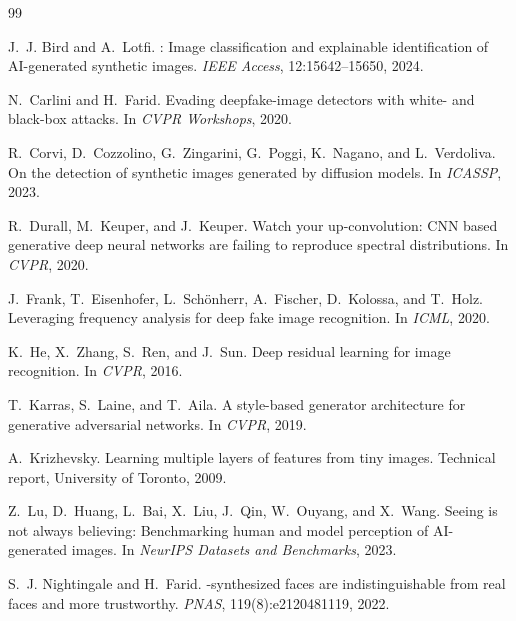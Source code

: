 \documentclass{article}
\begin{document}

\begin{thebibliography}{99}

J.~J. Bird and A.~Lotfi.
: {I}mage classification and explainable
  identification of {AI}-generated synthetic images.
\newblock \emph{IEEE Access}, 12:15642--15650, 2024.

N.~Carlini and H.~Farid.
\newblock Evading deepfake-image detectors with white- and black-box
  attacks.
\newblock In \emph{CVPR Workshops}, 2020.

R.~Corvi, D.~Cozzolino, G.~Zingarini, G.~Poggi, K.~Nagano, and
  L.~Verdoliva.
\newblock On the detection of synthetic images generated by diffusion
  models.
\newblock In \emph{ICASSP}, 2023.

R.~Durall, M.~Keuper, and J.~Keuper.
\newblock Watch your up-convolution: {CNN} based generative deep
  neural networks are failing to reproduce spectral distributions.
\newblock In \emph{CVPR}, 2020.

J.~Frank, T.~Eisenhofer, L.~Schönherr, A.~Fischer, D.~Kolossa, and
  T.~Holz.
\newblock Leveraging frequency analysis for deep fake image
  recognition.
\newblock In \emph{ICML}, 2020.

K.~He, X.~Zhang, S.~Ren, and J.~Sun.
\newblock Deep residual learning for image recognition.
\newblock In \emph{CVPR}, 2016.

T.~Karras, S.~Laine, and T.~Aila.
\newblock A style-based generator architecture for generative
  adversarial networks.
\newblock In \emph{CVPR}, 2019.

A.~Krizhevsky.
\newblock Learning multiple layers of features from tiny images.
\newblock Technical report, University of Toronto, 2009.

Z.~Lu, D.~Huang, L.~Bai, X.~Liu, J.~Qin, W.~Ouyang, and X.~Wang.
\newblock Seeing is not always believing: Benchmarking human and model
  perception of {AI}-generated images.
\newblock In \emph{NeurIPS Datasets and Benchmarks}, 2023.

S.~J. Nightingale and H.~Farid.
-synthesized faces are indistinguishable from real
  faces and more trustworthy.
\newblock \emph{PNAS}, 119(8):e2120481119, 2022.


\end{thebibliography}
\end{document}
